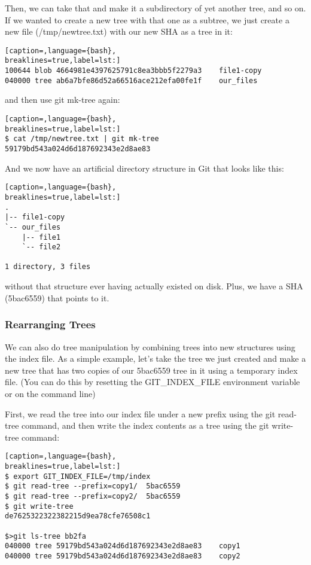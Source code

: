 Then, we can take that and make it a subdirectory of yet another tree, and so
on. If we wanted to create a new tree with that one as a subtree, we just
create a new file (/tmp/newtree.txt) with our new SHA as a tree in it:
\lstset{basicstyle=\scriptsize, numbers=none, captionpos=b, tabsize=4}
\begin{lstlisting}[caption=,language={bash},
breaklines=true,label=lst:]
100644 blob 4664981e4397625791c8ea3bbb5f2279a3    file1-copy
040000 tree ab6a7bfe86d52a66516ace212efa00fe1f    our_files
\end{lstlisting}

and then use git mk-tree again:
\lstset{basicstyle=\scriptsize, numbers=none, captionpos=b, tabsize=4}
\begin{lstlisting}[caption=,language={bash},
breaklines=true,label=lst:]
$ cat /tmp/newtree.txt | git mk-tree
59179bd543a024d6d187692343e2d8ae83
\end{lstlisting}

And we now have an artificial directory structure in Git that looks like this:
\lstset{basicstyle=\scriptsize, numbers=none, captionpos=b, tabsize=4}
\begin{lstlisting}[caption=,language={bash},
breaklines=true,label=lst:]
.
|-- file1-copy
`-- our_files
    |-- file1
    `-- file2

1 directory, 3 files
\end{lstlisting}

without that structure ever having actually existed on disk. Plus, we have a
SHA (5bac6559) that points to it.

\subsubsection{Rearranging Trees}
We can also do tree manipulation by combining trees into new structures using
the index file. As a simple example, let's take the tree we just created and
make a new tree that has two copies of our 5bac6559 tree in it using a
temporary index file. (You can do this by resetting the GIT\_INDEX\_FILE
environment variable or on the command line)

First, we read the tree into our index file under a new prefix using the git
read-tree command, and then write the index contents as a tree using the git
write-tree command:
\lstset{basicstyle=\scriptsize, numbers=none, captionpos=b, tabsize=4}
\begin{lstlisting}[caption=,language={bash},
breaklines=true,label=lst:]
$ export GIT_INDEX_FILE=/tmp/index
$ git read-tree --prefix=copy1/  5bac6559
$ git read-tree --prefix=copy2/  5bac6559
$ git write-tree 
de7625322322382215d9ea78cfe76508c1

$>git ls-tree bb2fa
040000 tree 59179bd543a024d6d187692343e2d8ae83    copy1
040000 tree 59179bd543a024d6d187692343e2d8ae83    copy2
\end{lstlisting}

